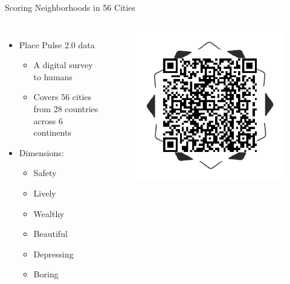 \documentclass{beamer}
\begin{document}
\begin{frame}{Scoring Neighborhoods in 56 Cities}
    \begin{columns}
    \begin{itemize}
        \item Place Pulse 2.0 data 
        \begin{itemize}
            \item A digital survey to humans
            \item Covers 56 cities from 28 countries across 6 continents
        \end{itemize}
        \item Dimensions: 
        \begin{itemize}
            \item Safety
            \item Lively
            \item Wealthy
            \item Beautiful
            \item Depressing
            \item Boring
        \end{itemize}
    \end{itemize}
    
    \begin{center}
            \begin{figure}
            \includegraphics[scale=0.4]{QR.png}
            \centering
        \end{figure}
    \end{center}
    \end{columns}
\end{frame}
\end{document}
